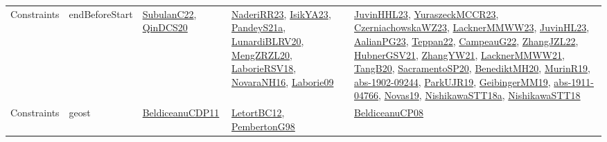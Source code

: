 {\begin{longtable}{lp{3cm}>{\raggedright}p{6cm}>{\raggedright}p{6cm}p{8cm}}
Constraints & endBeforeStart & \href{articles/SubulanC22.pdf}{SubulanC22}\cite{SubulanC22}, \href{articles/QinDCS20.pdf}{QinDCS20}\cite{QinDCS20} & \href{articles/NaderiRR23.pdf}{NaderiRR23}\cite{NaderiRR23}, \href{articles/IsikYA23.pdf}{IsikYA23}\cite{IsikYA23}, \href{articles/PandeyS21a.pdf}{PandeyS21a}\cite{PandeyS21a}, \href{articles/LunardiBLRV20.pdf}{LunardiBLRV20}\cite{LunardiBLRV20}, \href{articles/MengZRZL20.pdf}{MengZRZL20}\cite{MengZRZL20}, \href{articles/LaborieRSV18.pdf}{LaborieRSV18}\cite{LaborieRSV18}, \href{articles/NovaraNH16.pdf}{NovaraNH16}\cite{NovaraNH16}, \href{papers/Laborie09.pdf}{Laborie09}\cite{Laborie09} & \href{papers/JuvinHHL23.pdf}{JuvinHHL23}\cite{JuvinHHL23}, \href{articles/YuraszeckMCCR23.pdf}{YuraszeckMCCR23}\cite{YuraszeckMCCR23}, \href{articles/CzerniachowskaWZ23.pdf}{CzerniachowskaWZ23}\cite{CzerniachowskaWZ23}, \href{articles/LacknerMMWW23.pdf}{LacknerMMWW23}\cite{LacknerMMWW23}, \href{papers/JuvinHL23.pdf}{JuvinHL23}\cite{JuvinHL23}, \href{papers/AalianPG23.pdf}{AalianPG23}\cite{AalianPG23}, \href{papers/Teppan22.pdf}{Teppan22}\cite{Teppan22}, \href{articles/CampeauG22.pdf}{CampeauG22}\cite{CampeauG22}, \href{papers/ZhangJZL22.pdf}{ZhangJZL22}\cite{ZhangJZL22}, \href{articles/HubnerGSV21.pdf}{HubnerGSV21}\cite{HubnerGSV21}, \href{articles/ZhangYW21.pdf}{ZhangYW21}\cite{ZhangYW21}, \href{papers/LacknerMMWW21.pdf}{LacknerMMWW21}\cite{LacknerMMWW21}, \href{papers/TangB20.pdf}{TangB20}\cite{TangB20}, \href{articles/SacramentoSP20.pdf}{SacramentoSP20}\cite{SacramentoSP20}, \href{articles/BenediktMH20.pdf}{BenediktMH20}\cite{BenediktMH20}, \href{papers/MurinR19.pdf}{MurinR19}\cite{MurinR19}, \href{articles/abs-1902-09244.pdf}{abs-1902-09244}\cite{abs-1902-09244}, \href{papers/ParkUJR19.pdf}{ParkUJR19}\cite{ParkUJR19}, \href{papers/GeibingerMM19.pdf}{GeibingerMM19}\cite{GeibingerMM19}, \href{articles/abs-1911-04766.pdf}{abs-1911-04766}\cite{abs-1911-04766}, \href{articles/Novas19.pdf}{Novas19}\cite{Novas19}, \href{papers/NishikawaSTT18a.pdf}{NishikawaSTT18a}\cite{NishikawaSTT18a}, \href{papers/NishikawaSTT18.pdf}{NishikawaSTT18}\cite{NishikawaSTT18}\\
Constraints & geost & \href{articles/BeldiceanuCDP11.pdf}{BeldiceanuCDP11}\cite{BeldiceanuCDP11} & \href{papers/LetortBC12.pdf}{LetortBC12}\cite{LetortBC12}, \href{papers/PembertonG98.pdf}{PembertonG98}\cite{PembertonG98} & \href{papers/BeldiceanuCP08.pdf}{BeldiceanuCP08}\cite{BeldiceanuCP08}\\

\end{longtable}}
